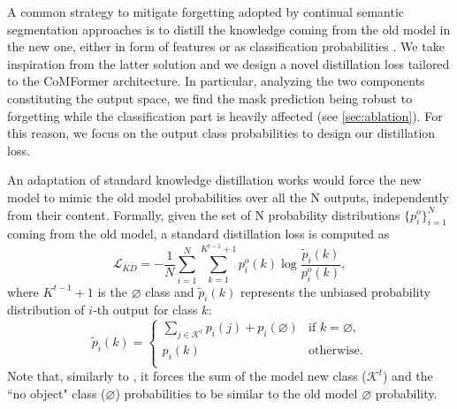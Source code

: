 \documentclass[10pt,twocolumn,letterpaper]{article}
\begin{document}
A common strategy to mitigate forgetting adopted by continual semantic segmentation approaches \cite{cermelli2020modelingthebackground, michieli2019ilt, douillard2020plop} is to distill the knowledge coming from the old model in the new one, either in form of features \cite{douillard2020plop, michieli2019ilt} or as classification probabilities \cite{cermelli2020modelingthebackground}.
We take inspiration from the latter solution and we design a novel distillation loss tailored to the CoMFormer architecture. In particular, analyzing the two components constituting the output space, we find the mask prediction being robust to forgetting while the classification part is heavily affected (see \cref{sec:ablation}). For this reason, we focus on the output class probabilities to design our distillation loss.

An adaptation of standard knowledge distillation works \cite{cermelli2020modelingthebackground} would force the new model to mimic the old model probabilities over all the N outputs, independently from their content. Formally, given the set of N probability distributions $\{p_i^{o}\}_{i=1}^{N}$ coming from the old model, a standard distillation loss is computed as
\begin{equation} \label{eq:ukd}
    \mathcal{L}_{KD} = - \frac{1}{N} \sum_{i=1}^{N} \sum_{k=1}^{K^{t-1}+1} p_i^o(k) \log \frac{\tilde{p}_i(k)}{p_i^o(k)},
\end{equation}
where $K^{t-1}+1$ is the $\varnothing$ class and $\tilde{p}_i(k)$ represents the unbiased probability distribution of $i$-th output for class $k$:
\begin{equation}
    \tilde{p}_i(k) =
    \begin{cases}
        \sum_{j \in \mathcal{K}^t} p_i(j) + p_i(\varnothing) & \text{if $k = \varnothing$},\\
        p_i(k) & \text{otherwise}.\\
    \end{cases}
\end{equation}
Note that, similarly to \cite{cermelli2020modelingthebackground}, it forces the sum of the model new class ($\mathcal{K}^t$) and the “no object" class ($\varnothing$) probabilities to be similar to the old model $\varnothing$ probability.
\end{document}
